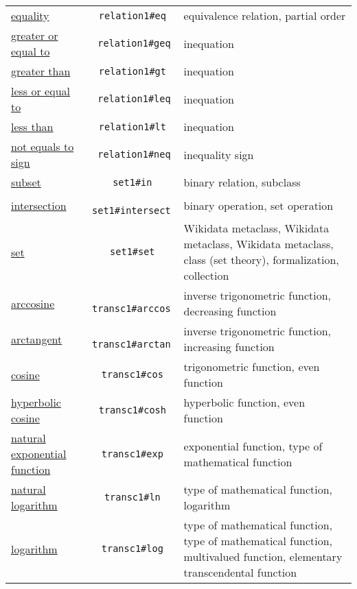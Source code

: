 \documentclass[a4paper]{article}
\begin{document}
\begin{table}[p]
\begin{tabular}{p{.23\linewidth}cp{.5\linewidth}}
\href{https://www.wikidata.org/entity/Q842346}{equality} &\texttt{ relation1\#eq }& equivalence relation, partial order \\
\href{https://www.wikidata.org/entity/Q55935291}{greater or equal to} &\texttt{ relation1\#geq }& inequation \\
\href{https://www.wikidata.org/entity/Q47035128}{greater than} &\texttt{ relation1\#gt }& inequation \\
\href{https://www.wikidata.org/entity/Q55935272}{less or equal to} &\texttt{ relation1\#leq }& inequation \\
\href{https://www.wikidata.org/entity/Q52834024}{less than} &\texttt{ relation1\#lt }& inequation \\
\href{https://www.wikidata.org/entity/Q21778965}{not equals to sign} &\texttt{ relation1\#neq }& inequality sign \\
\href{https://www.wikidata.org/entity/Q177646}{subset} &\texttt{ set1\#in }& binary relation, subclass \\
\href{https://www.wikidata.org/entity/Q185837}{intersection} &\texttt{ set1\#intersect }& binary operation, set operation \\
\href{https://www.wikidata.org/entity/Q36161}{set} &\texttt{ set1\#set }& Wikidata metaclass, Wikidata metaclass, Wikidata metaclass, class (set theory), formalization, collection \\
\href{https://www.wikidata.org/entity/Q720341}{arccosine} &\texttt{ transc1\#arccos }& inverse trigonometric function, decreasing function \\
\href{https://www.wikidata.org/entity/Q2257242}{arctangent} &\texttt{ transc1\#arctan }& inverse trigonometric function, increasing function \\
\href{https://www.wikidata.org/entity/Q1256164}{cosine} &\texttt{ transc1\#cos }& trigonometric function, even function \\
\href{https://www.wikidata.org/entity/Q1253682}{hyperbolic cosine} &\texttt{ transc1\#cosh }& hyperbolic function, even function \\
\href{https://www.wikidata.org/entity/Q47306354}{natural exponential function} &\texttt{ transc1\#exp }& exponential function, type of mathematical function \\
\href{https://www.wikidata.org/entity/Q204037}{natural logarithm} &\texttt{ transc1\#ln }& type of mathematical function, logarithm \\
\href{https://www.wikidata.org/entity/Q11197}{logarithm} &\texttt{ transc1\#log }& type of mathematical function, type of mathematical function, multivalued function, elementary transcendental function \\

\end{tabular}
\end{table}
\end{document}
